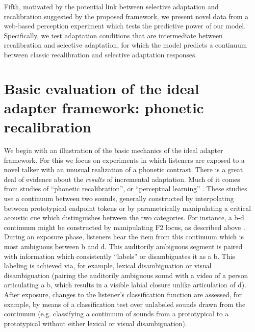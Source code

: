 Fifth, motivated by the potential link between selective adaptation and recalibration suggested by the proposed framework, we present novel data from a web-based perception experiment which tests the predictive power of our model. Specifically, we test adaptation conditions that are intermediate between recalibration and selective adaptation, for which the model predicts a continuum between classic recalibration and selective adaptation responses. %



\section{Basic evaluation of the ideal adapter framework: phonetic recalibration}
\label{sec:model-recal}

We begin with an illustration of the basic mechanics of the ideal adapter framework. For this we focus on experiments in which listeners are exposed to a novel talker with an unusual realization of a phonetic contrast. There is a great deal of evidence about the \emph{results} of incremental adaptation. Much of it comes from studies of ``phonetic recalibration'', or ``perceptual learning'' \autocite{Bertelson2003,Kraljic2005,Norris2003}.  These studies use a continuum between two sounds, generally constructed by interpolating between prototypical endpoint tokens \autocite[e.g.][]{Kraljic2005,Norris2003} or by parametrically manipulating a critical acoustic cue which distinguishes between the two categories.  For instance, a \ph b-\ph d continuum might be constructed by manipulating F2 locus, as described above \autocite{Bertelson2003,Vroomen2004}.  During an exposure phase, listeners hear the item from this continuum which is most ambiguous between \ph b and \ph d.  This auditorily ambiguous segment is paired with information which consistently ``labels'' or disambiguates it as a \ph b.  This labeling is achieved via, for example, lexical disambiguation \autocite[e.g. replacing the \ph b in \emph{club} with the ambiguous segment,][etc.]{Kraljic2005,Norris2003} or visual disambiguation (pairing the auditorily ambiguous sound with a video of a person articulating a \ph b, which results in a visible labial closure unlike articulation of \ph d).  After exposure, changes to the listener's classification function are assessed, for example, by means of a classification test over unlabeled sounds drawn from the continuum (e.g. classifying a continuum of sounds from a prototypical  to a prototypical  without either lexical or visual disambiguation).

